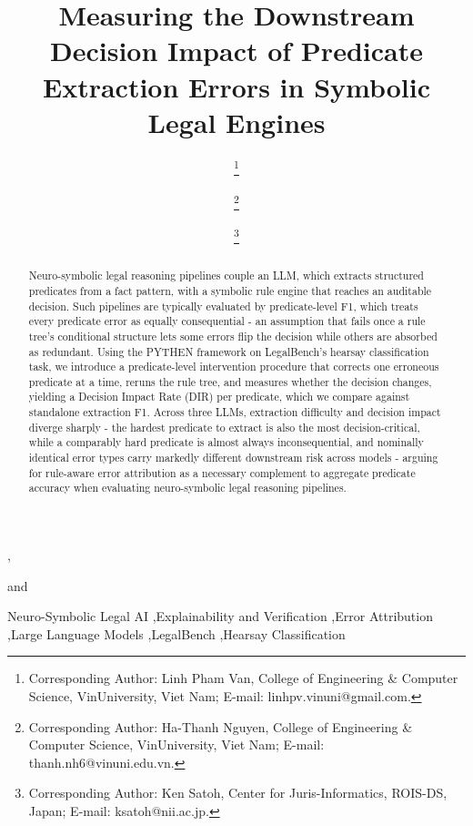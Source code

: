 \documentclass{IOS-Book-Article}
\begin{document}
\begin{frontmatter}

\title{Measuring the Downstream Decision Impact of Predicate Extraction Errors in Symbolic Legal Engines}

\author[A]{ %
\thanks{Corresponding Author: Linh Pham Van, College of Engineering \& Computer Science, VinUniversity, Viet Nam; E-mail: linhpv.vinuni@gmail.com.}},
\author[A]{ %
\thanks{Corresponding Author: Ha-Thanh Nguyen, College of Engineering \& Computer Science, VinUniversity, Viet Nam; E-mail: thanh.nh6@vinuni.edu.vn.}}
and
\author[B]{ %
\thanks{Corresponding Author: Ken Satoh, Center for Juris-Informatics, ROIS-DS, Japan; E-mail: ksatoh@nii.ac.jp.}}

\address[A]{College of Engineering \& Computer Science, VinUniversity, Viet Nam}
\address[B]{Center for Juris-Informatics, ROIS-DS, Japan}

\begin{abstract}
Neuro-symbolic legal reasoning pipelines couple an LLM, which extracts structured predicates from a fact pattern, with a symbolic rule engine that reaches an auditable decision. Such pipelines are typically evaluated by predicate-level F1, which treats every predicate error as equally consequential - an assumption that fails once a rule tree's conditional structure lets some errors flip the decision while others are absorbed as redundant. Using the PYTHEN framework on LegalBench's hearsay classification task, we introduce a predicate-level intervention procedure that corrects one erroneous predicate at a time, reruns the rule tree, and measures whether the decision changes, yielding a Decision Impact Rate (DIR) per predicate, which we compare against standalone extraction F1. Across three LLMs, extraction difficulty and decision impact diverge sharply - the hardest predicate to extract is also the most decision-critical, while a comparably hard predicate is almost always inconsequential, and nominally identical error types carry markedly different downstream risk across models - arguing for rule-aware error attribution as a necessary complement to aggregate predicate accuracy when evaluating neuro-symbolic legal reasoning pipelines.
\end{abstract}

\begin{keyword}
Neuro-Symbolic Legal AI \sep Explainability and Verification \sep Error Attribution \sep Large Language Models \sep LegalBench \sep Hearsay Classification
\end{keyword}

\end{frontmatter}
\end{document}
